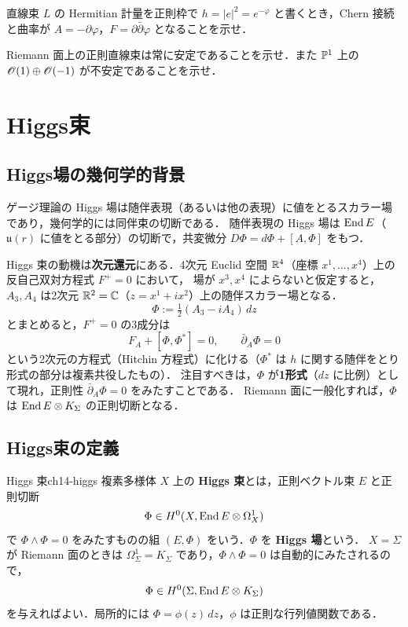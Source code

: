 直線束 $L$ の Hermitian 計量を正則枠で $h=|e|^2=e^{-\varphi}$ と書くとき，Chern 接続と曲率が $A=-\partial\varphi$，$F=\partial\bar\partial\varphi$ となることを示せ．

Riemann 面上の正則直線束は常に安定であることを示せ．また $\mathbb{P}^1$ 上の $\mathscr{O}(1)\oplus\mathscr{O}(-1)$ が不安定であることを示せ．

\section{Higgs束}

\subsection{Higgs場の幾何学的背景}

ゲージ理論の Higgs 場は随伴表現（あるいは他の表現）に値をとるスカラー場であり，幾何学的には同伴束の切断である．
随伴表現の Higgs 場は $\operatorname{End} E$（$\mathfrak{u}(r)$ に値をとる部分）の切断で，共変微分 $D\Phi = d\Phi+[A,\Phi]$ をもつ．

Higgs 束の動機は\textbf{次元還元}にある．4次元 Euclid 空間 $\mathbb{R}^4$（座標 $x^1,\dots,x^4$）上の反自己双対方程式 $F^+=0$ において，
場が $x^3,x^4$ によらないと仮定すると，$A_3,A_4$ は2次元 $\mathbb{R}^2=\mathbb{C}$（$z=x^1+ix^2$）上の随伴スカラー場となる．
\begin{equation}
  \Phi := \tfrac12(A_3 - iA_4)\,dz
\end{equation}
とまとめると，$F^+=0$ の3成分は
\begin{equation}
  F_A + [\Phi,\Phi^*] = 0,\qquad \bar\partial_A\Phi = 0
  \label{eq:ch14-hitchin-pre}
\end{equation}
という2次元の方程式（Hitchin 方程式）に化ける（$\Phi^*$ は $h$ に関する随伴をとり形式の部分は複素共役したもの）．
注目すべきは，$\Phi$ が\textbf{1形式}（$dz$ に比例）として現れ，正則性 $\bar\partial_A\Phi=0$ をみたすことである．
Riemann 面に一般化すれば，$\Phi$ は $\operatorname{End} E\otimes K_\Sigma$ の正則切断となる．

\subsection{Higgs束の定義}

\begin{mydef}{Higgs 束}{ch14-higgs}
複素多様体 $X$ 上の \textbf{Higgs 束}とは，正則ベクトル束 $E$ と正則切断
\begin{equation}
  \Phi\in H^0(X,\operatorname{End} E\otimes\Omega^1_X)
\end{equation}
で $\Phi\wedge\Phi=0$ をみたすものの組 $(E,\Phi)$ をいう．$\Phi$ を \textbf{Higgs 場}という．
$X=\Sigma$ が Riemann 面のときは $\Omega^1_\Sigma=K_\Sigma$ であり，$\Phi\wedge\Phi=0$ は自動的にみたされるので，
\begin{equation}
  \Phi\in H^0(\Sigma,\operatorname{End} E\otimes K_\Sigma)
\end{equation}
を与えればよい．局所的には $\Phi = \phi(z)\,dz$，$\phi$ は正則な行列値関数である．
\end{mydef}

